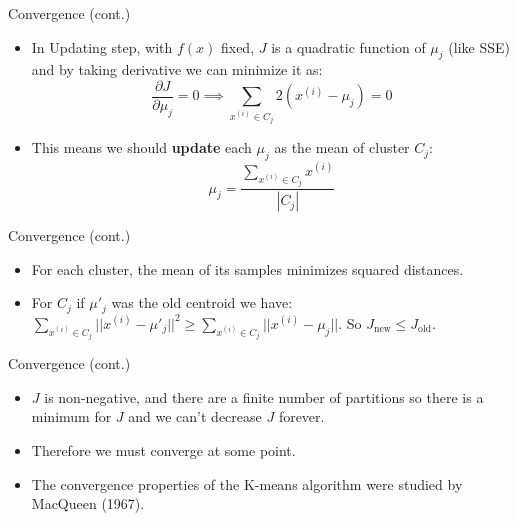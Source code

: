 \documentclass[serif, aspectratio=169]{beamer}
\begin{document}
\begin{frame}{Convergence (cont.)}
\begin{itemize}
    \item In Updating step, with $f(x)$ fixed, $J$ is a quadratic function of $\mu_j$ (like SSE) and by taking derivative we can minimize it as:
    $$
        \frac{\partial J}{\partial \mu_j } = 0 \implies \sum_{x^{(i)} \in C_j} 2 \left(x^{(i)} - \mu_j \right) = 0
    $$
    \item This means we should \textbf{update} each $\mu_j$ as the mean of cluster $C_j$:
    $$
        \mu_j = \frac{\sum_{x^{(i)} \in C_j} x^{(i)}}{|C_j|}
    $$
\end{itemize}
\end{frame}

\begin{frame}{Convergence (cont.)}
    \begin{itemize}
        \item For each cluster, the mean of its samples minimizes squared distances.
        \item For $C_j$ if $\mu'_j$ was the old centroid we have: $\sum_{x^{(i)} \in C_j} ||x^{(i)}-\mu'_j||^2 \geq \sum_{x^{(i)} \in C_j} ||x^{(i)}-\mu_j||$. So  $J_{\text{new}} \leq J_{\text{old}} $.
    \end{itemize}
\end{frame}

\begin{frame}{Convergence (cont.)}
    \begin{itemize}
\item $J$ is non-negative, and there are a finite number of partitions so there is a minimum for $J$ and we can't decrease $J$ forever.
 \item  Therefore we must converge at some point.
\item  The convergence properties of the K-means algorithm were studied by MacQueen (1967).

    \end{itemize}
\end{frame}
\end{document}
